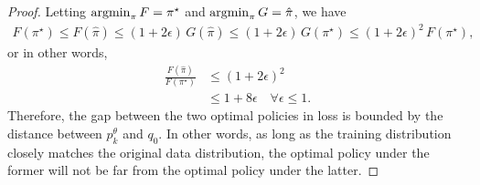 \begin{proof}
Letting $\operatorname*{argmin}_\pi F = \pi^\star$ and $\operatorname*{argmin}_\pi G = \hat{\pi}$, we have
\begin{align*}
    F(\pi^\star)
\leq F(\hat{\pi})
\leq (1+2\epsilon)\,G(\hat{\pi})
\leq (1+2\epsilon)\,G(\pi^\star)
\leq (1+2\epsilon)^2\,F(\pi^\star),
\end{align*}
or in other words, 
\begin{align*}
    \frac{F(\hat{\pi})}{F(\pi^\star)} &\leq (1+2\epsilon)^2 \\
    &\leq 1+8\epsilon \quad \forall \epsilon \leq 1.
\end{align*}
Therefore, the gap between the two optimal policies in loss is bounded by the distance between $p^\theta_k$ and $q_0$. In other words, as long as the training distribution closely matches the original data distribution, the optimal policy under the former will not be far from the optimal policy under the latter.
\end{proof}
\iffalse
